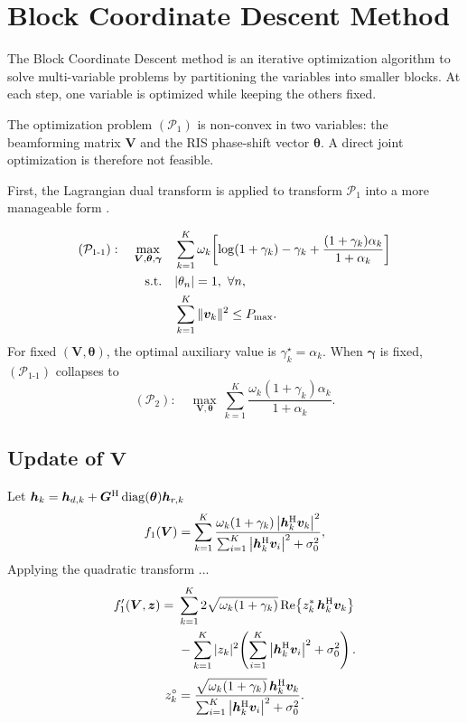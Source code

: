 \section{Block Coordinate Descent Method}

The Block Coordinate Descent method is an iterative optimization algorithm to solve multi-variable problems by partitioning the variables into smaller blocks. At each step, one variable is optimized while keeping the others fixed.

The optimization problem $(\mathcal{P}_1)$ is non-convex in two variables: the beamforming matrix $\bm{V}$ and the RIS phase-shift vector $\bm{\theta}$.
A direct joint optimization is therefore not feasible.

First, the Lagrangian dual transform is applied to transform $\mathcal{P}_1$ into a more manageable form \cite{shen2018fractional}.

\begin{align}
    (\mathcal{P}_{1\text{-}1}): \quad \max_{\bm{V}, \bm{\theta}, \bm{\gamma}} \quad
    & \sum_{k=1}^{K} \omega_k \!\left[\log(1+\gamma_k) - \gamma_k + \frac{(1+\gamma_k)\alpha_k}{1+\alpha_k}\right] \notag \\
    \text{s.t.} \quad & |\theta_n| = 1, \ \forall n, \\
    & \sum_{k=1}^{K} \|\bm{v}_k\|^2 \le P_{\max}.
\end{align}
For fixed $(\bm{V}, \bm{\theta})$, the optimal auxiliary value is $\gamma_k^\star = \alpha_k$.
When $\bm{\gamma}$ is fixed, $(\mathcal{P}_{1\text{-}1})$ collapses to
\begin{equation}
    (\mathcal{P}_2): \quad \max_{\bm{V}, \bm{\theta}} \ \sum_{k=1}^{K} \frac{\omega_k (1+\gamma_k)\alpha_k}{1+\alpha_k}.
\end{equation}

\subsection{Update of $\bm{V}$}

Let $\bm{h}_k = \bm{h}_{d,k} + \bm{G}^{\mathrm{H}} \operatorname{diag}(\bm{\theta})\bm{h}_{r,k}$
\begin{equation}
    f_1(\bm{V}) =
    \sum_{k=1}^{K}
    \frac{\omega_k(1+\gamma_k)\left|\bm{h}_k^{{\mathrm{H}}}\bm{v}_k\right|^2}
    {\sum_{i=1}^{K}\left|\bm{h}_k^{{\mathrm{H}}}\bm{v}_i\right|^2+\sigma_0^2},
\end{equation}
Applying the quadratic transform \cite{shen2018fractional} ...
\begin{align}
    f_1'(\bm{V}, \bm{z}) = \ & \sum_{k=1}^{K} 2\sqrt{\omega_k(1+\gamma_k)}\, \mathrm{Re}\!\left\{z_k^{*}\, \bm{h}_k^{{\mathrm{H}}}\bm{v}_k\right\} \notag \\
    & - \sum_{k=1}^{K} |z_k|^2 \!\left(\sum_{i=1}^{K}\left|\bm{h}_k^{{\mathrm{H}}}\bm{v}_i\right|^2 + \sigma_0^2\right).
\end{align}
\begin{equation}
    z_k^{\circ} = \frac{\sqrt{\omega_k(1+\gamma_k)}\, \bm{h}_k^{{\mathrm{H}}}\bm{v}_k}{\sum_{i=1}^{K}\left|\bm{h}_k^{{\mathrm{H}}}\bm{v}_i\right|^2 + \sigma_0^2}.
\end{equation}

